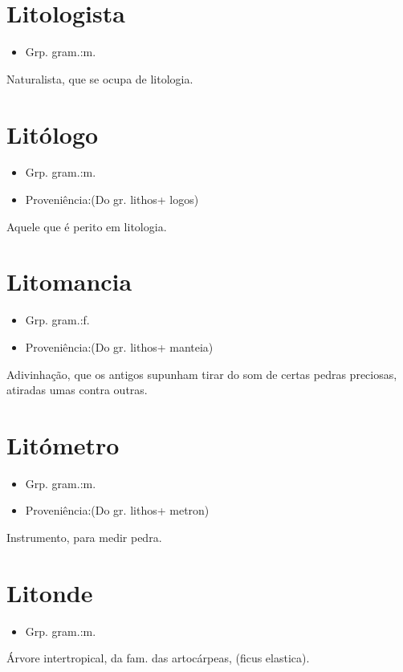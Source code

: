 \section{Litologista}
\begin{itemize}
\item {Grp. gram.:m.}
\end{itemize}
Naturalista, que se ocupa de litologia.
\section{Litólogo}
\begin{itemize}
\item {Grp. gram.:m.}
\end{itemize}
\begin{itemize}
\item {Proveniência:(Do gr. \textunderscore lithos\textunderscore  + \textunderscore logos\textunderscore )}
\end{itemize}
Aquele que é perito em litologia.
\section{Litomancia}
\begin{itemize}
\item {Grp. gram.:f.}
\end{itemize}
\begin{itemize}
\item {Proveniência:(Do gr. \textunderscore lithos\textunderscore  + \textunderscore manteia\textunderscore )}
\end{itemize}
Adivinhação, que os antigos supunham tirar do som de certas pedras preciosas, atiradas umas contra outras.
\section{Litómetro}
\begin{itemize}
\item {Grp. gram.:m.}
\end{itemize}
\begin{itemize}
\item {Proveniência:(Do gr. \textunderscore lithos\textunderscore  + \textunderscore metron\textunderscore )}
\end{itemize}
Instrumento, para medir pedra.
\section{Litonde}
\begin{itemize}
\item {Grp. gram.:m.}
\end{itemize}
Árvore intertropical, da fam. das artocárpeas, (\textunderscore ficus elastica\textunderscore ).
